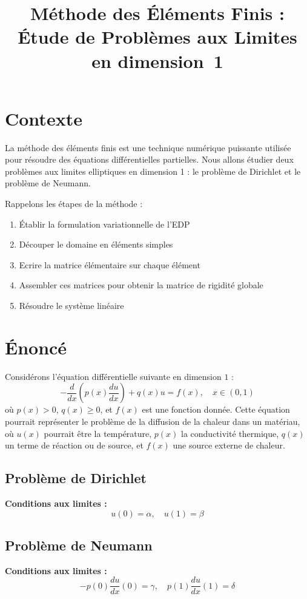 \documentclass[a4paper,12pt]{article}
\title{Méthode des Éléments Finis : Étude de Problèmes aux Limites en dimension~1}
\date{}
\begin{document}
\maketitle

\section*{Contexte}
La méthode des éléments finis est une technique numérique puissante utilisée pour résoudre des équations différentielles partielles. Nous allons étudier deux problèmes aux limites elliptiques en dimension 1 : le problème de Dirichlet et le problème de Neumann. 

Rappelons les étapes de la méthode :
\begin{enumerate}
    \item Établir la formulation variationnelle de l'EDP
    \item Découper le domaine en éléments simples
    \item Ecrire la matrice élémentaire sur chaque élément
    \item Assembler ces matrices pour obtenir la matrice de rigidité globale
    \item Résoudre le système linéaire
\end{enumerate}

\section*{Énoncé}

Considérons l'équation différentielle suivante en dimension $1$ :
\[
- \frac{d}{dx} \left( p(x) \frac{du}{dx} \right) + q(x) u = f(x), \quad x \in (0, 1)
\]
où \( p(x) > 0 \), \( q(x) \geq 0 \), et \( f(x) \) est une fonction donnée.
Cette équation pourrait représenter le problème de la diffusion de la chaleur dans un matériau, où \( u(x) \) pourrait être la température, \( p(x) \) la conductivité thermique, \( q(x) \) un terme de réaction ou de source, et \( f(x) \) une source externe de chaleur. 
\subsection*{Problème de Dirichlet}
\textbf{Conditions aux limites :}
\[
u(0) = \alpha, \quad u(1) = \beta
\]

\subsection*{Problème de Neumann}
\textbf{Conditions aux limites :}
\[
- p(0) \frac{du}{dx}(0) = \gamma, \quad p(1) \frac{du}{dx}(1) = \delta
\]
\end{document}
